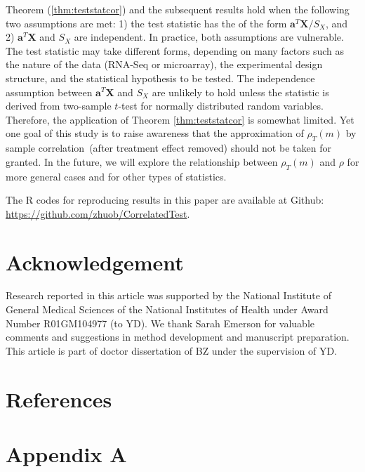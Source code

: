 \documentclass[review]{elsarticle}
\newcommand{\samplecor}{sample correlation}
\begin{document}
Theorem (\ref{thm:teststatcor}) and the subsequent results hold when the following two 
assumptions are met: 1) the test statistic has the of 
the form $\bm a^T\bm X/S_X$, and 2) $\bm a^T\bm X$ and $S_X$ are independent. In practice, both 
assumptions are vulnerable.
The test statistic may take different forms, depending on many factors such as the nature of 
the data (RNA-Seq or microarray), the 
experimental design structure, and the statistical hypothesis to be tested. The independence 
assumption between $\bm a^T\bm X$ and $S_X$ are 
unlikely to hold unless the statistic is derived from two-sample $t$-test for normally 
distributed random variables. Therefore, the 
application of Theorem \ref{thm:teststatcor} is somewhat limited. Yet one goal of this study is 
to raise awareness that the approximation of $\rho_T(m)$ by \samplecor~(after treatment effect 
removed) should not be taken for 
granted. In the future, we will explore the relationship 
between $\rho_T(m)$ and $\rho$ for more general cases and for other types of statistics. 

The R codes for reproducing results in this paper are available at Github: 
\url{https://github.com/zhuob/CorrelatedTest}.

\section*{Acknowledgement}
Research reported in this article was supported by the National Institute of General Medical 
Sciences of the National Institutes of Health under Award Number R01GM104977 (to YD). 
We thank Sarah Emerson for valuable comments and suggestions in method development and 
manuscript preparation. This article is part of doctor dissertation of BZ under the supervision 
of YD.


\section*{References}




\newpage

\section*{Appendix A}\label{section:testcormethod}
\end{document}
